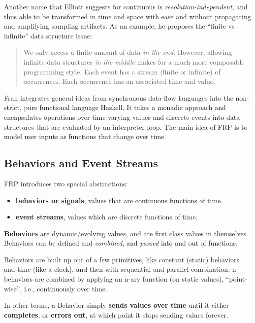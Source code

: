 Another name that Elliott suggests for continuous is
\emph{resolution-independent}, and thus able to be transformed in time
and space with ease and without propagating and amplifying sampling
artifacts. As an example, he proposes the ``finite vs infinite'' data
structure issue:

\begin{quote}
We only access a finite amount of data \emph{in the end}. However,
allowing infinite data structures \emph{in the middle} makes for a much
more composable programming style. Each event has a stream (finite or
infinite) of occurrences. Each occurrence has an associated time and
value.
\end{quote}

Fran integrates general ideas from synchronous data-flow languages into
the non-strict, pure functional language Haskell. It takes a monadic
approach and encapsulates operations over time-varying values and
discrete events into data structures that are evaluated by an
interpreter loop. The main idea of FRP is to model user inputs as
functions that change over time.


\subsection{Behaviors and Event Streams}\label{behaviors-and-event-streams}

FRP introduces two special abstractions:

\begin{itemize}
\itemsep1pt\parskip0pt
\item
  \textbf{behaviors or signals}, values that are continuous functions of
  time.
\item
  \textbf{event streams}, values which are discrete functions of time.
\end{itemize}

\textbf{Behaviors} are dynamic/evolving values, and are first class
values in themselves. Behaviors can be defined and \emph{combined}, and
\emph{passed} into and out of functions.

Behaviors are built up out of a few primitives, like constant (static)
behaviors and time (like a clock), and then with sequential and parallel
combination. n-behaviors are combined by applying an n-ary function (on
static values), ``point-wise'', i.e., continuously over time.

In other terms, a Behavior simply \textbf{sends values over time} until
it either \textbf{completes}, or \textbf{errors out}, at which point it
stops sending values forever.

